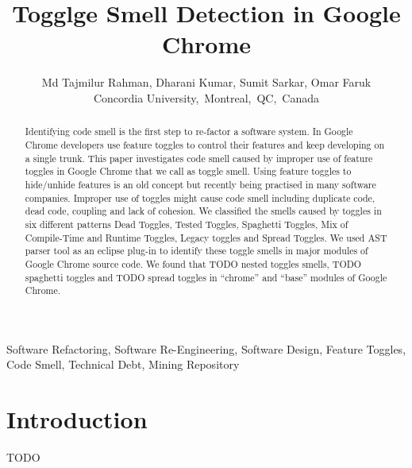 \documentclass[conference]{IEEEtran}
\begin{document}
\title{Togglge Smell Detection in Google Chrome}
\author{
Md Tajmilur Rahman, Dharani Kumar, Sumit Sarkar, Omar Faruk\\
Concordia University,~Montreal,~QC,~Canada
}
\maketitle

\begin{abstract}
Identifying code smell is the first step to re-factor a software system. 
In Google Chrome developers use feature toggles to control their features 
and keep developing on a single trunk. This paper investigates code smell 
caused by improper use of feature toggles in Google Chrome that we call 
as toggle smell. Using feature toggles to hide/unhide features is an old 
concept but recently being practised in many software companies. Improper 
use of toggles might cause code smell including duplicate code, dead code, 
coupling and lack of cohesion. We classified the smells caused by toggles 
in six different patterns Dead Toggles, Tested Toggles, Spaghetti Toggles, 
Mix of Compile-Time and Runtime Toggles, Legacy toggles and Spread Toggles. 
We used AST parser tool as an eclipse plug-in to identify these toggle 
smells in major modules of Google Chrome source code. We found that TODO 
nested toggles smells, TODO spaghetti toggles and TODO spread toggles in ``chrome'' and ``base'' modules of Google Chrome.
\end{abstract}

\begin{IEEEkeywords}
Software Refactoring, Software Re-Engineering, Software Design, Feature Toggles, Code Smell, Technical Debt, Mining Repository
\end{IEEEkeywords}

\section{Introduction}
TODO
\end{document}
